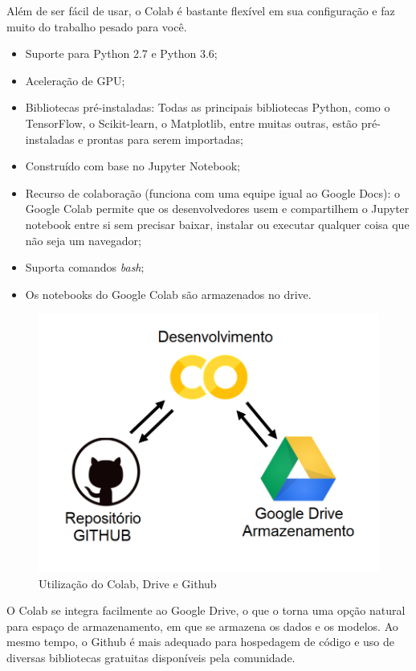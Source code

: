 Além de ser fácil de usar, o Colab é bastante flexível em sua configuração e faz muito do trabalho pesado para você. \cite{colabdetail}

\begin{itemize}
    \item Suporte para Python 2.7 e Python 3.6;
    \item Aceleração de GPU;
    \item Bibliotecas pré-instaladas: Todas as principais bibliotecas Python, como o TensorFlow, o Scikit-learn, o Matplotlib, entre muitas outras, estão pré-instaladas e prontas para serem importadas;
    \item Construído com base no Jupyter Notebook;
    \item Recurso de colaboração (funciona com uma equipe igual ao Google Docs): o Google Colab permite que os desenvolvedores usem e compartilhem o Jupyter notebook entre si sem precisar baixar, instalar ou executar qualquer coisa que não seja um navegador;
    \item Suporta comandos \textit{bash};
    \item Os notebooks do Google Colab são armazenados no drive.
\end{itemize}

\begin{figure}[htbp]
		\centering
		\includegraphics[scale=0.4]{figuras/MachineLearning/colabGithub.png}
		\caption{Utilização do Colab, Drive e Github}
		\label{fig:colabGithub}
\end{figure}

O Colab se integra facilmente ao Google Drive, o que o torna uma opção natural para espaço de armazenamento, em que se armazena os dados e os modelos. Ao mesmo tempo, o Github é mais adequado para hospedagem de código e uso de diversas  bibliotecas gratuitas disponíveis pela comunidade. 

